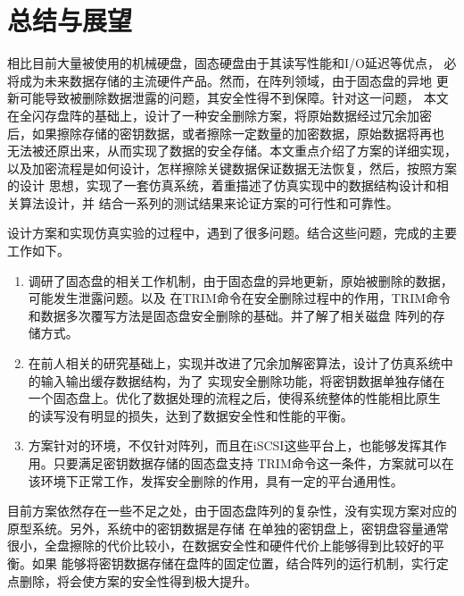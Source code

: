 \chapter{总结与展望}
相比目前大量被使用的机械硬盘，固态硬盘由于其读写性能和I/O延迟等优点，
必将成为未来数据存储的主流硬件产品。然而，在阵列领域，由于固态盘的异地
更新可能导致被删除数据泄露的问题，其安全性得不到保障。针对这一问题，
本文在全闪存盘阵的基础上，设计了一种安全删除方案，将原始数据经过冗余加密
后，如果擦除存储的密钥数据，或者擦除一定数量的加密数据，原始数据将再也
无法被还原出来，从而实现了数据的安全存储。本文重点介绍了方案的详细实现，
以及加密流程是如何设计，怎样擦除关键数据保证数据无法恢复，然后，按照方案的设计
思想，实现了一套仿真系统，着重描述了仿真实现中的数据结构设计和相关算法设计，并
结合一系列的测试结果来论证方案的可行性和可靠性。


设计方案和实现仿真实验的过程中，遇到了很多问题。结合这些问题，完成的主要工作如下。
\begin{enumerate}
        \item 调研了固态盘的相关工作机制，由于固态盘的异地更新，原始被删除的数据，可能发生泄露问题。以及
        在TRIM命令在安全删除过程中的作用，TRIM命令和数据多次覆写方法是固态盘安全删除的基础。并了解了相关磁盘
        阵列的存储方式。
        \item 在前人相关的研究基础上，实现并改进了冗余加解密算法，设计了仿真系统中的输入输出缓存数据结构，为了
        实现安全删除功能，将密钥数据单独存储在一个固态盘上。优化了数据处理的流程之后，使得系统整体的性能相比原生
        的读写没有明显的损失，达到了数据安全性和性能的平衡。
        \item 方案针对的环境，不仅针对阵列，而且在iSCSI这些平台上，也能够发挥其作用。只要满足密钥数据存储的固态盘支持
        TRIM命令这一条件，方案就可以在该环境下正常工作，发挥安全删除的作用，具有一定的平台通用性。
\end{enumerate}


目前方案依然存在一些不足之处，由于固态盘阵列的复杂性，没有实现方案对应的原型系统。另外，系统中的密钥数据是存储
在单独的密钥盘上，密钥盘容量通常很小，全盘擦除的代价比较小，在数据安全性和硬件代价上能够得到比较好的平衡。如果
能够将密钥数据存储在盘阵的固定位置，结合阵列的运行机制，实行定点删除，将会使方案的安全性得到极大提升。
